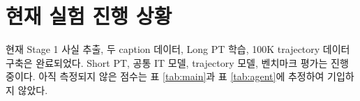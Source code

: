 \section{현재 실험 진행 상황}

현재 Stage 1 사실 추출, 두 caption 데이터, Long PT 학습,
100K trajectory 데이터 구축은 완료되었다. Short PT, 공통 IT
모델, trajectory 모델, 벤치마크 평가는 진행 중이다. 아직 측정되지
않은 점수는 표 \ref{tab:main}과 표 \ref{tab:agent}에 추정하여
기입하지 않았다.
